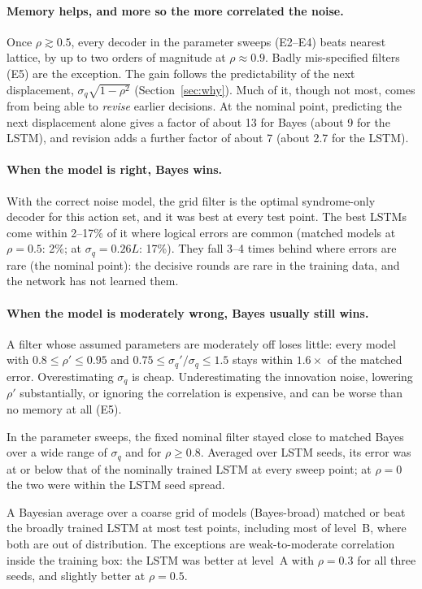 \paragraph{Memory helps, and more so the more correlated the noise.}
Once $\rho\gtrsim0.5$, every decoder in the parameter sweeps (E2--E4) beats
nearest lattice, by up to two orders of magnitude at $\rho\approx0.9$. Badly
mis-specified filters (E5) are the exception. The gain follows the
predictability of the next displacement, $\sigma_q\sqrt{1-\rho^2}$
(Section~\ref{sec:why}). Much of it, though not most, comes from being able
to \emph{revise} earlier decisions. At the nominal point, predicting the next
displacement alone gives a factor of about 13 for Bayes (about 9 for the
LSTM), and revision adds a further factor of about 7 (about 2.7 for the LSTM).

\paragraph{When the model is right, Bayes wins.}
With the correct noise model, the grid filter is the optimal syndrome-only
decoder for this action set, and it was best at every test point. The best
LSTMs come within 2--17\% of it where logical errors are common (matched
models at $\rho=0.5$: 2\%; at $\sigma_q=0.26L$: 17\%). They fall 3--4 times
behind where errors are rare (the nominal point): the decisive rounds are
rare in the training data, and the network has not learned them.

\paragraph{When the model is moderately wrong, Bayes usually still wins.}
A filter whose assumed parameters are moderately off loses little: every
model with $0.8\le\rho'\le0.95$ and $0.75\le\sigma_q'/\sigma_q\le1.5$ stays
within $1.6\times$ of the matched error. Overestimating $\sigma_q$ is cheap.
Underestimating the innovation noise, lowering $\rho'$ substantially, or
ignoring the correlation is expensive, and can be worse than no memory at all
(E5).

In the parameter sweeps, the fixed nominal filter stayed close to matched
Bayes over a wide range of $\sigma_q$ and for $\rho\ge0.8$. Averaged over
LSTM seeds, its error was at or below that of the nominally trained LSTM at
every sweep point; at $\rho=0$ the two were within the LSTM seed spread.

A Bayesian average over a coarse grid of models (Bayes-broad) matched or beat
the broadly trained LSTM at most test points, including most of level~B,
where both are out of distribution. The exceptions are weak-to-moderate
correlation inside the training box: the LSTM was better at level~A with
$\rho=0.3$ for all three seeds, and slightly better at $\rho=0.5$.


